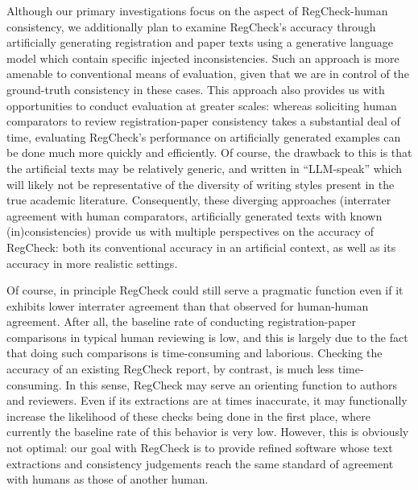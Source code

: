 \documentclass{article}
\begin{document}
Although our primary investigations focus on the aspect of RegCheck-human consistency, we additionally plan to examine RegCheck's accuracy through artificially generating registration and paper texts using a generative language model which contain specific injected inconsistencies. Such an approach is more amenable to conventional means of evaluation, given that we are in control of the ground-truth consistency in these cases. This approach also provides us with opportunities to conduct evaluation at greater scales: whereas soliciting human comparators to review registration-paper consistency takes a substantial deal of time, evaluating RegCheck's performance on artificially generated examples can be done much more quickly and efficiently. Of course, the drawback to this is that the artificial texts may be relatively generic, and written in ``LLM-speak'' which will likely not be representative of the diversity of writing styles present in the true academic literature. Consequently, these diverging approaches (interrater agreement with human comparators, artificially generated texts with known (in)consistencies) provide us with multiple perspectives on the accuracy of RegCheck: both its conventional accuracy in an artificial context, as well as its accuracy in more realistic settings.

Of course, in principle RegCheck could still serve a pragmatic function even if it exhibits lower interrater agreement than that observed for human-human agreement. After all, the baseline rate of conducting registration-paper comparisons in typical human reviewing is low, and this is largely due to the fact that doing such comparisons is time-consuming and laborious. Checking the accuracy of an existing RegCheck report, by contrast, is much less time-consuming. In this sense, RegCheck may serve an orienting function to authors and reviewers. Even if its extractions are at times inaccurate, it may functionally increase the likelihood of these checks being done in the first place, where currently the baseline rate of this behavior is very low. However, this is obviously not optimal: our goal with RegCheck is to provide refined software whose text extractions and consistency judgements reach the same standard of agreement with humans as those of another human.
\end{document}
